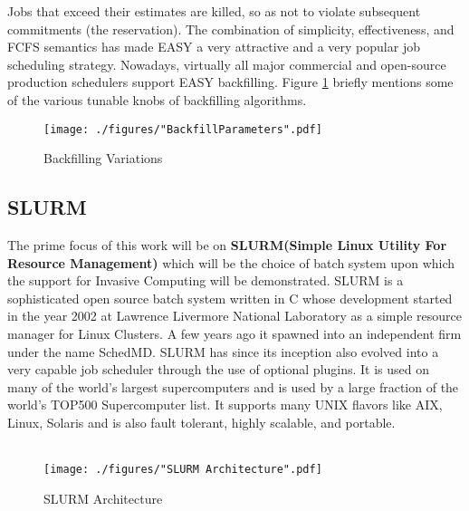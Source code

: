 Jobs that exceed their estimates are killed, so as not to violate subsequent commitments (the reservation). The combination of simplicity, effectiveness, and FCFS semantics has made EASY a very attractive and a very popular job scheduling strategy. Nowadays, virtually all major commercial and open-source production schedulers support EASY backfilling. Figure \ref{fig:3} briefly mentions some of the various tunable knobs of backfilling algorithms.
\begin{figure}[!htbp]
\centering
\texttt{[image: ./figures/"BackfillParameters".pdf]}
\caption{Backfilling Variations}
\label{fig:3}
\end{figure}
\subsection{SLURM}
The prime focus of this work will be on \textbf{SLURM(Simple Linux Utility For Resource Management)} which will be the choice of batch system upon which the support for Invasive Computing will be demonstrated. SLURM is a sophisticated open source batch system written in C whose development started in the year 2002 at Lawrence Livermore National Laboratory as a simple resource manager for Linux Clusters. A few years ago it spawned into an independent firm under the name SchedMD. SLURM has since its inception also evolved into a very capable job scheduler through the use of optional plugins. It is used on many of the world's largest supercomputers and is used by a large fraction of the world's TOP500 Supercomputer list. It supports many UNIX flavors like AIX, Linux, Solaris and is also fault tolerant, highly scalable, and portable.\\ \\
\begin{figure}[!ht]
\centering
\texttt{[image: ./figures/"SLURM Architecture".pdf]}
\caption{SLURM Architecture}
\label{fig:6}
\end{figure}
\noindent
